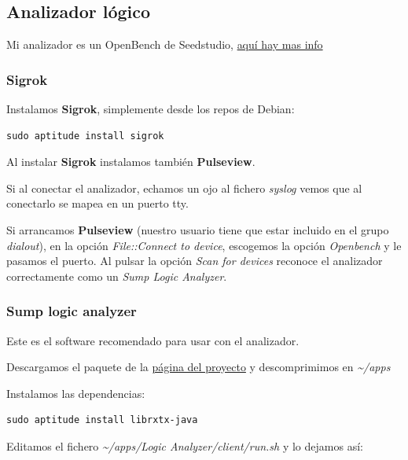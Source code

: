 \documentclass[12pt,spanish,]{scrartcl}
\begin{document}
\hypertarget{analizador-luxf3gico}{%
\subsection{Analizador lógico}\label{analizador-luxf3gico}}

Mi analizador es un OpenBench de Seedstudio,
\href{http://dangerousprototypes.com/docs/Open_Bench_Logic_Sniffer}{aquí
hay mas info}

\hypertarget{sigrok}{%
\subsubsection{Sigrok}\label{sigrok}}

Instalamos \textbf{Sigrok}, simplemente desde los repos de Debian:

\begin{verbatim}
sudo aptitude install sigrok
\end{verbatim}

Al instalar \textbf{Sigrok} instalamos también \textbf{Pulseview}.

Si al conectar el analizador, echamos un ojo al fichero \emph{syslog}
vemos que al conectarlo se mapea en un puerto tty.

Si arrancamos \textbf{Pulseview} (nuestro usuario tiene que estar
incluido en el grupo \emph{dialout}), en la opción \emph{File::Connect
to device}, escogemos la opción \emph{Openbench} y le pasamos el puerto.
Al pulsar la opción \emph{Scan for devices} reconoce el analizador
correctamente como un \emph{Sump Logic Analyzer}.

\hypertarget{sump-logic-analyzer}{%
\subsubsection{Sump logic analyzer}\label{sump-logic-analyzer}}

Este es el software recomendado para usar con el analizador.

Descargamos el paquete de la \href{https://www.sump.org}{página del
proyecto} y descomprimimos en \emph{\textasciitilde{}/apps}

Instalamos las dependencias:

\begin{verbatim}
sudo aptitude install librxtx-java
\end{verbatim}

Editamos el fichero \emph{\textasciitilde{}/apps/Logic
Analyzer/client/run.sh} y lo dejamos así:
\end{document}
